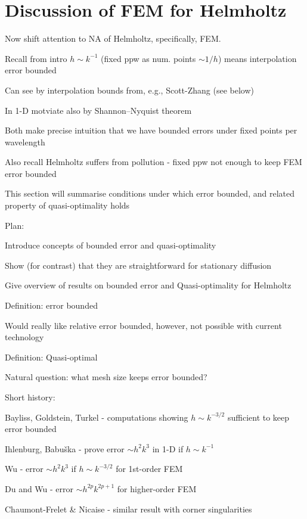 \section{Discussion of FEM for Helmholtz}
\bit
\item Now shift attention to NA of Helmholtz, specifically, FEM.
\item Recall from intro $h\sim k^{-1}$ (fixed ppw as num. points $\sim 1/h$) means interpolation error bounded
\bit
\item Can see by interpolation bounds from, e.g., Scott-Zhang (see below)
\item In 1-D motviate also by Shannon--Nyquist theorem
\item Both make precise intuition that we have bounded errors under fixed points per wavelength
\eit
\item Also recall Helmholtz suffers from pollution - fixed ppw not enough to keep FEM error bounded
\item This section will summarise conditions under which error bounded, and related property of quasi-optimality holds
\item Plan:
\bit
\item Introduce concepts of bounded error and quasi-optimality
\item Show (for contrast) that they are straightforward for stationary diffusion
\item Give overview of results on bounded error and Quasi-optimality for Helmholtz
\eit
\eit
\bit
\item Definition: error bounded
\item Would really like relative error bounded, however, not possible with current technology
\item Definition: Quasi-optimal
\item Natural question: what mesh size keeps error bounded?
\item Short history:
\bit
\item Bayliss, Goldstein, Turkel - computations showing $h\sim k^{-3/2}$ sufficient to keep error bounded
\item Ihlenburg, Babu\v{s}ka - prove error $\sim h^2k^3$ in 1-D if $h \sim k^{-1}$
\item Wu - error $\sim h^2k^3$ if $h \sim k^{-3/2}$ for 1st-order FEM
\item Du and Wu - error $\sim h^{2p}k^{2p+1}$ for higher-order FEM
\item Chaumont-Frelet \& Nicaise - similar result with corner singularities
